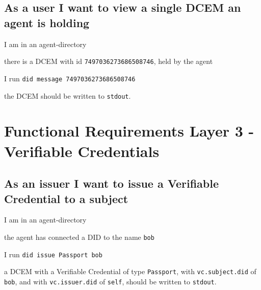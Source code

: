 \subsection{As a user I want to view a single DCEM an agent is holding}
\begin{description}[1.35cm]
    \item[Given] I am in an agent-directory
    \item[and] there is a DCEM with id \texttt{7497036273686508746}, held by the agent
    \item[When] I run \texttt{did message 7497036273686508746}
    \item[Then] the DCEM should be written to \texttt{stdout}.
\end{description}



\newpage



\section{Functional Requirements Layer 3 - Verifiable Credentials}



\subsection{As an issuer I want to issue a Verifiable Credential to a subject}
\begin{description}[1.35cm]
    \item[Given] I am in an agent-directory
    \item[and] the agent has connected a DID to the name \texttt{bob}
    \item[When] I run \texttt{did issue Passport bob}
    \item[Then] a DCEM with a Verifiable Credential of type \texttt{Passport}, with \texttt{vc.subject.did} of \texttt{bob}, and with \texttt{vc.issuer.did} of \texttt{self}, should be written to \texttt{stdout}.
\end{description}



